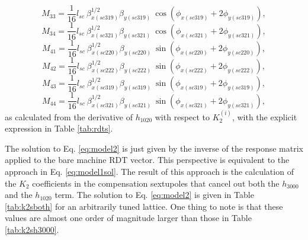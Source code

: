 \begin{equation}
    M_{33}=\frac{1}{16} l_{sc} \: \beta^{1/2}_{x(sc319)} \beta_{y(sc319)} \: \cos \left( \phi_{x(sc319)} + 2\phi_{y(sc319)} \right),
    \label{eq:M33}
\end{equation}
\begin{equation}
    M_{34}=\frac{1}{16} l_{sc} \: \beta^{1/2}_{x(sc321)} \beta_{y(sc321)} \: \cos \left( \phi_{x(sc321)} + 2\phi_{y(sc321)} \right),
    \label{eq:M34}
\end{equation}
\begin{equation}
    M_{41}=\frac{1}{16} l_{sc} \: \beta^{1/2}_{x(sc220)} \beta_{y(sc220)} \: \sin \left( \phi_{x(sc220)} + 2\phi_{y(sc220)} \right),
    \label{eq:M41}
\end{equation}
\begin{equation}
    M_{42}=\frac{1}{16} l_{sc} \: \beta^{1/2}_{x(sc222)} \beta_{y(sc222)} \: \sin \left( \phi_{x(sc222)} + 2\phi_{y(sc222)} \right),
    \label{eq:M42}
\end{equation}
\begin{equation}
    M_{43}=\frac{1}{16} l_{sc} \: \beta^{1/2}_{x(sc319)} \beta_{y(sc319)} \: \sin \left( \phi_{x(sc319)} + 2\phi_{y(sc319)} \right),
    \label{eq:M43}
\end{equation}
\begin{equation}
    M_{44}=\frac{1}{16} l_{sc} \: \beta^{1/2}_{x(sc321)} \beta_{y(sc321)} \: \sin \left( \phi_{x(sc321)} + 2\phi_{y(sc321)} \right),
    \label{eq:M44}
\end{equation}
as calculated from the derivative of $h_{1020}$ with respect to $K_2^{(i)}$, with the explicit expression in Table \ref{tab:rdts}.

The solution to Eq. \ref{eq:model2} is just given by the inverse of the response matrix applied to the bare machine RDT vector. This perspective is equivalent to the approach in Eq. \ref{eq:model1sol}. The result of this approach is the calculation of the $K_2$ coefficients in the compensation sextupoles that cancel out both the $h_{3000}$ and the $h_{1020}$ term. The solution to Eq. \ref{eq:model2} is given in Table \ref{tab:k2sboth} for an arbitrarily tuned lattice. One thing to note is that these values are almost one order of magnitude larger than those in Table \ref{tab:k2sh3000}. 

